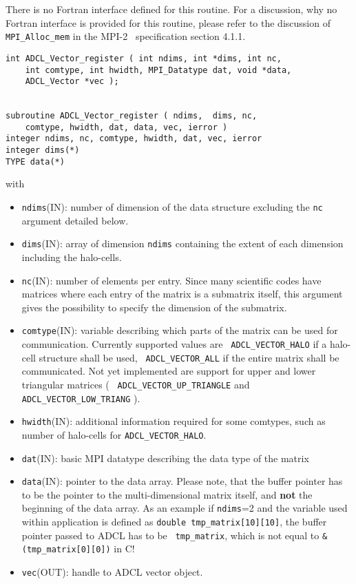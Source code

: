 There is no Fortran interface defined for this routine. For a discussion, why
no Fortran interface is provided for this routine, please refer to the
discussion of {\tt MPI\_Alloc\_mem} in the MPI-2~\cite{mpi2} specification
section 4.1.1.

\hspace{1cm}
\begin{verbatim}
int ADCL_Vector_register ( int ndims, int *dims, int nc, 
    int comtype, int hwidth, MPI_Datatype dat, void *data, 
    ADCL_Vector *vec );


subroutine ADCL_Vector_register ( ndims,  dims, nc, 
    comtype, hwidth, dat, data, vec, ierror )
integer ndims, nc, comtype, hwidth, dat, vec, ierror
integer dims(*)
TYPE data(*)
\end{verbatim}
with
\begin{itemize}
\item {\tt ndims}(IN): number of dimension of the data structure excluding the
  {\tt nc} argument detailed below.
\item {\tt dims}(IN): array of dimension {\tt ndims} containing the extent of
  each dimension including the halo-cells.
\item {\tt nc}(IN): number of elements per entry. Since many scientific codes
  have matrices where each entry of the matrix is a submatrix itself, this
  argument gives the possibility to specify the dimension of the submatrix.
\item {\tt comtype}(IN): variable describing which parts of the matrix can be
  used for communication. Currently supported values are {\tt
    ADCL\_VECTOR\_HALO} if a halo-cell structure shall be used, {\tt
    ADCL\_VECTOR\_ALL} if the entire matrix shall be communicated. Not yet
  implemented are support for upper and lower triangular matrices ( {\tt
    ADCL\_VECTOR\_UP\_TRIANGLE} and {\tt ADCL\_VECTOR\_LOW\_TRIANG} ).
\item {\tt hwidth}(IN): additional information required for some comtypes,
  such as number of halo-cells for {\tt ADCL\_VECTOR\_HALO}.
\item {\tt dat}(IN): basic MPI datatype describing the data type of the matrix
\item {\tt data}(IN): pointer to the data array. Please note, that the buffer
  pointer has to be the pointer to the multi-dimensional matrix itself, and
  {\bf not} the beginning of the data array. As an example if {\tt ndims}=2
  and the variable used within application is defined as {\tt double
    tmp\_matrix[10][10]}, the buffer pointer passed to ADCL has to be {\tt
    tmp\_matrix}, which is not equal to {\tt \&(tmp\_matrix[0][0])} in C!
\item {\tt vec}(OUT): handle to ADCL vector object.
\end{itemize}

